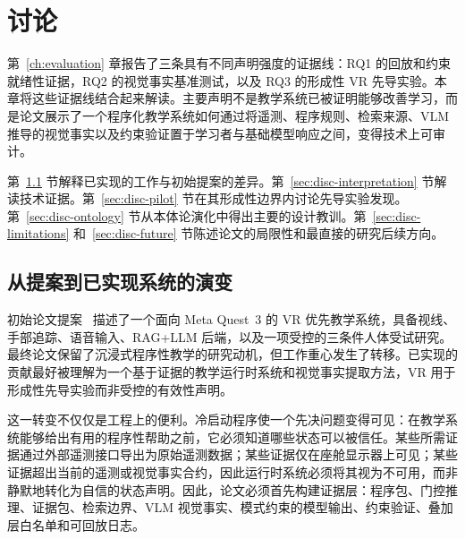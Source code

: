 %
\chapter{讨论}\label{ch:discussion}

第~\ref{ch:evaluation} 章报告了三条具有不同声明强度的证据线：RQ1 的回放和约束就绪性证据，RQ2 的视觉事实基准测试，以及 RQ3 的形成性 VR 先导实验。本章将这些证据线结合起来解读。主要声明不是教学系统已被证明能够改善学习，而是论文展示了一个程序化教学系统如何通过将遥测、程序规则、检索来源、VLM 推导的视觉事实以及约束验证置于学习者与基础模型响应之间，变得技术上可审计。

第~\ref{sec:disc-evolution} 节解释已实现的工作与初始提案的差异。第~\ref{sec:disc-interpretation} 节解读技术证据。第~\ref{sec:disc-pilot} 节在其形成性边界内讨论先导实验发现。第~\ref{sec:disc-ontology} 节从本体论演化中得出主要的设计教训。第~\ref{sec:disc-limitations} 和~\ref{sec:disc-future} 节陈述论文的局限性和最直接的研究后续方向。

\section{从提案到已实现系统的演变}\label{sec:disc-evolution}

初始论文提案~\citep{ThesisProposal1128} 描述了一个面向 Meta Quest~3 的 VR 优先教学系统，具备视线、手部追踪、语音输入、RAG+LLM 后端，以及一项受控的三条件人体受试研究。最终论文保留了沉浸式程序性教学的研究动机，但工作重心发生了转移。已实现的贡献最好被理解为一个基于证据的教学运行时系统和视觉事实提取方法，VR 用于形成性先导实验而非受控的有效性声明。

这一转变不仅仅是工程上的便利。冷启动程序使一个先决问题变得可见：在教学系统能够给出有用的程序性帮助之前，它必须知道哪些状态可以被信任。某些所需证据通过外部遥测接口导出为原始遥测数据；某些证据仅在座舱显示器上可见；某些证据超出当前的遥测或视觉事实合约，因此运行时系统必须将其视为不可用，而非静默地转化为自信的状态声明。因此，论文必须首先构建证据层：程序包、门控推理、证据包、检索边界、VLM 视觉事实、模式约束的模型输出、约束验证、叠加层白名单和可回放日志。

